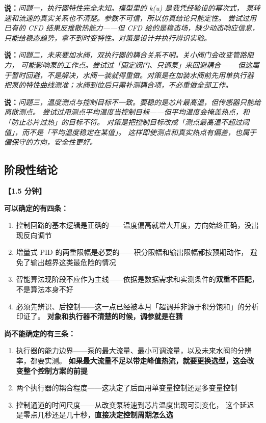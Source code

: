 \documentclass[11pt,a4paper]{ctexart}
\newcommand{\shuo}[1]{\par{\color{cBlue}\bfseries 说：}{\itshape #1}\par}
\newcommand{\dongzuo}[1]{\par{\color{cWarnLine}\bfseries 【#1】}\par}
\begin{document}
\shuo{问题一，执行器特性完全未知。模型里的 k(u) 是我凭经验设的幂次式，
泵转速和流速的真实关系也不清楚。参数不可信，所以仿真结论只能定性。
尝试过用已有的 CFD 结果反推散热能力——但 CFD 给的是稳态场，缺少动态响应信息，
只能给稳态趋势，拿不到时变特性。对策是设计并执行辨识实验。}

\shuo{问题二，未来要加水阀，双执行器的耦合关系不明。关小阀门会改变管路阻力，
可能影响泵的工作点。尝试过「固定阀门、只调泵」来回避耦合——
但这属于暂时回避，不是解决，水阀一装就得重做。对策是在加装水阀前先用单执行器
把泵的特性曲线测准；水阀到位后只需补测耦合项，不必重做全部工作。}

\shuo{问题三，温度测点与控制目标不一致。要稳的是芯片最高温，但传感器只能给离散测点。
尝试过用测点平均温度当控制目标——但平均温度会掩盖热点，和「防止芯片过热」的目标不符。
对策是把控制目标改成「测点最高温不超过阈值」，而不是「平均温度稳定在某值」。
这样即使测点和真实热点有偏差，也属于偏保守的方向，安全性更好。}

\subsection{阶段性结论}

\dongzuo{1.5 分钟}

\textbf{可以确定的有四条：}

\begin{enumerate}
  \item 控制回路的基本逻辑是正确的——温度偏高就增大开度，方向始终正确，没出现反向调节
  \item 增量式 PID 的两重限幅是必要的——积分限幅和输出限幅都按预期动作，
        避免了输出越界这类最危险的情况
  \item 智能算法现阶段不应作为主线——依据是数据需求和实测条件的\textbf{双重不匹配}，
        不是算法本身不好
  \item 必须先辨识、后控制——这一点已经被本月「超调并非源于积分饱和」的分析印证了。
        \textbf{对象和执行器不清楚的时候，调参就是在猜}
\end{enumerate}

\textbf{尚不能确定的有三条：}

\begin{enumerate}
  \item 执行器的能力边界——泵的最大流量、最小可调流量，以及未来水阀的分辨率，都要实测。
        \textbf{如果最大流量不足以带走峰值热流，就要更换选型，这会改变整个控制方案的前提}
  \item 两个执行器的耦合程度——这决定了后面用单变量控制还是多变量控制
  \item 控制通道的时间尺度——从改变泵转速到芯片温度出现可测变化，
        这个延迟是零点几秒还是几十秒，\textbf{直接决定控制周期怎么选}
\end{enumerate}
\end{document}
